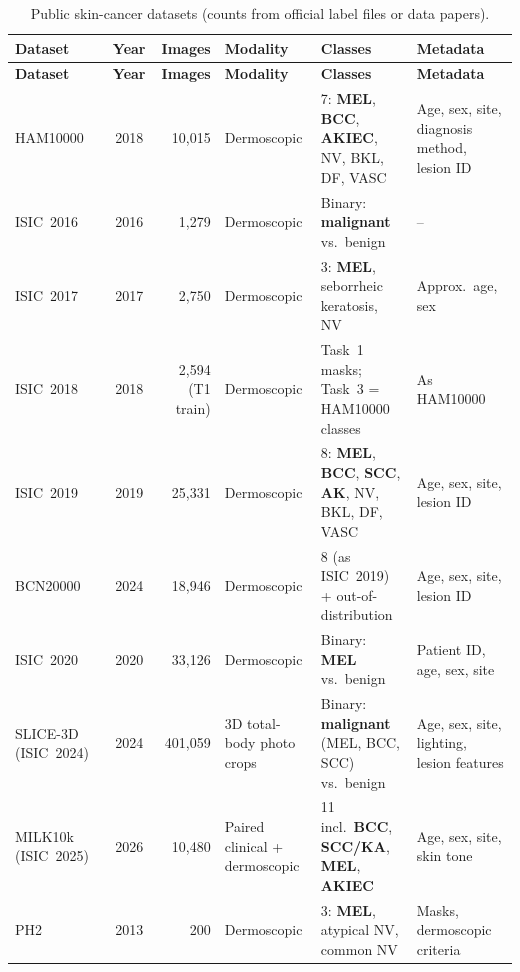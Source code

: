 \documentclass[10pt,a4paper]{article}
\begin{document}
{\small
\renewcommand{\arraystretch}{1.2}
\begin{longtable}{@{}L{2.2cm} c r L{2.0cm} L{4.2cm} L{3.3cm}@{}}
\caption{Public skin-cancer datasets (counts from official label files or data papers).}\label{tab:summary}\\
\toprule
\textbf{Dataset} & \textbf{Year} & \textbf{Images} & \textbf{Modality} & \textbf{Classes} & \textbf{Metadata} \\
\midrule
\endfirsthead
\toprule
\textbf{Dataset} & \textbf{Year} & \textbf{Images} & \textbf{Modality} & \textbf{Classes} & \textbf{Metadata} \\
\midrule
\endhead
HAM10000~\cite{tschandl2018ham10000} & 2018 & 10{,}015 & Dermoscopic & 7: \textbf{MEL}, \textbf{BCC}, \textbf{AKIEC}, NV, BKL, DF, VASC & Age, sex, site, diagnosis method, lesion ID \\
ISIC~2016~\cite{gutman2016isic} & 2016 & 1{,}279 & Dermoscopic & Binary: \textbf{malignant} vs.\ benign & -- \\
ISIC~2017~\cite{codella2018isic2017} & 2017 & 2{,}750 & Dermoscopic & 3: \textbf{MEL}, seborrheic keratosis, NV & Approx.\ age, sex \\
ISIC~2018~\cite{codella2019isic2018} & 2018 & 2{,}594 (T1 train) & Dermoscopic & Task~1 masks; Task~3 = HAM10000 classes & As HAM10000 \\
ISIC~2019~\cite{gessert2020} & 2019 & 25{,}331 & Dermoscopic & 8: \textbf{MEL}, \textbf{BCC}, \textbf{SCC}, \textbf{AK}, NV, BKL, DF, VASC & Age, sex, site, lesion ID \\
BCN20000~\cite{hernandez2024bcn20000} & 2024 & 18{,}946 & Dermoscopic & 8 (as ISIC~2019) + out-of-distribution & Age, sex, site, lesion ID \\
ISIC~2020~\cite{rotemberg2021isic2020} & 2020 & 33{,}126 & Dermoscopic & Binary: \textbf{MEL} vs.\ benign & Patient ID, age, sex, site \\
SLICE-3D (ISIC~2024)~\cite{kurtansky2024slice3d} & 2024 & 401{,}059 & 3D total-body photo crops & Binary: \textbf{malignant} (MEL, BCC, SCC) vs.\ benign & Age, sex, site, lighting, lesion features \\
MILK10k (ISIC~2025)~\cite{tschandl2026milk10k} & 2026 & 10{,}480 & Paired clinical + dermoscopic & 11 incl.\ \textbf{BCC}, \textbf{SCC/KA}, \textbf{MEL}, \textbf{AKIEC} & Age, sex, site, skin tone \\
PH2~\cite{mendonca2013ph2} & 2013 & 200 & Dermoscopic & 3: \textbf{MEL}, atypical NV, common NV & Masks, dermoscopic criteria \\

\end{longtable}}
\end{document}
